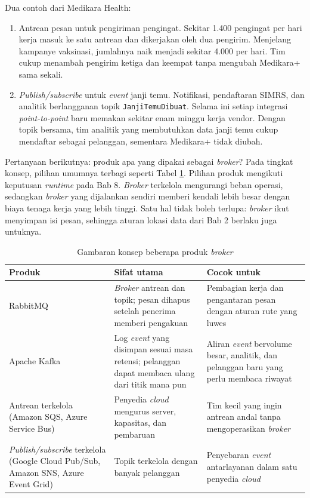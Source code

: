 Dua contoh dari Medikara Health:
\begin{enumerate}
  \item Antrean pesan untuk pengiriman pengingat. Sekitar 1.400 pengingat per hari kerja masuk ke
        satu antrean dan dikerjakan oleh dua pengirim. Menjelang kampanye vaksinasi, jumlahnya naik
        menjadi sekitar 4.000 per hari. Tim cukup menambah pengirim ketiga dan keempat tanpa
        mengubah Medikara+ sama sekali.
  \item \textit{Publish/subscribe} untuk \textit{event} janji temu. Notifikasi, pendaftaran SIMRS,
        dan analitik berlangganan topik \texttt{JanjiTemuDibuat}. Selama ini setiap integrasi
        \textit{point-to-point} baru memakan sekitar enam minggu kerja vendor. Dengan topik
        bersama, tim analitik yang membutuhkan data janji temu cukup mendaftar sebagai pelanggan,
        sementara Medikara+ tidak diubah.
\end{enumerate}

Pertanyaan berikutnya: produk apa yang dipakai sebagai \textit{broker}? Pada tingkat konsep, pilihan
umumnya terbagi seperti Tabel \ref{tab:ch09-produk-broker}. Pilihan produk mengikuti keputusan
\textit{runtime} pada Bab 8. \textit{Broker} terkelola mengurangi beban operasi, sedangkan
\textit{broker} yang dijalankan sendiri memberi kendali lebih besar dengan biaya tenaga kerja yang
lebih tinggi. Satu hal tidak boleh terlupa: \textit{broker} ikut menyimpan isi pesan, sehingga aturan
lokasi data dari Bab 2 berlaku juga untuknya.

\begin{table}[!htb]
  \centering
  \caption{Gambaran konsep beberapa produk \textit{broker}}
  \label{tab:ch09-produk-broker}
  \footnotesize
  \begin{tabularx}{\textwidth}{>{\raggedright\arraybackslash}p{2.6cm} >{\raggedright\arraybackslash}X >{\raggedright\arraybackslash}X}
    \hline
    \textbf{Produk} & \textbf{Sifat utama} & \textbf{Cocok untuk} \\ \hline
    RabbitMQ & \textit{Broker} antrean dan topik; pesan dihapus setelah penerima memberi pengakuan &
      Pembagian kerja dan pengantaran pesan dengan aturan rute yang luwes \\ \hline
    Apache Kafka & Log \textit{event} yang disimpan sesuai masa retensi; pelanggan dapat membaca ulang
      dari titik mana pun & Aliran \textit{event} bervolume besar, analitik, dan pelanggan baru yang
      perlu membaca riwayat \\ \hline
    Antrean terkelola (Amazon SQS, Azure Service Bus) & Penyedia \textit{cloud} mengurus server,
      kapasitas, dan pembaruan & Tim kecil yang ingin antrean andal tanpa mengoperasikan
      \textit{broker} \\ \hline
    \textit{Publish/subscribe} terkelola (Google Cloud Pub/Sub, Amazon SNS, Azure Event Grid) &
      Topik terkelola dengan banyak pelanggan & Penyebaran \textit{event} antarlayanan dalam satu
      penyedia \textit{cloud} \\ \hline
  \end{tabularx}
\end{table}


